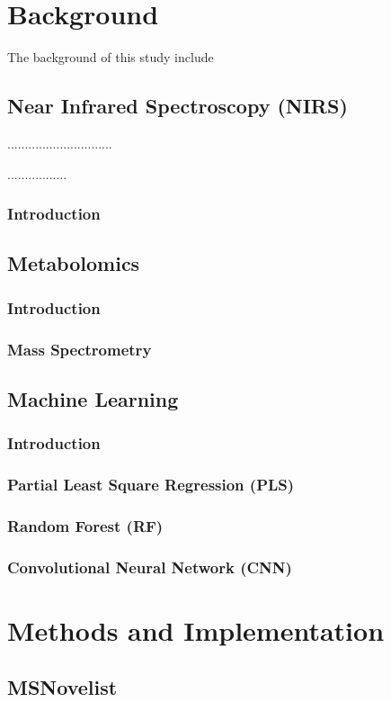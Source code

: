 \documentclass[12pt,a4paper]{report}
\begin{document}
\chapter{Background}
The background of this study include
\section{Near Infrared Spectroscopy (NIRS)}
..............................\par
.................
\subsection{Introduction}
\section{Metabolomics}
\subsection{Introduction}
\subsection{Mass Spectrometry}


\section{Machine Learning}
\subsection{Introduction}
\subsection{Partial Least Square Regression (PLS)}
\subsection{Random Forest (RF)}
\subsection{Convolutional Neural Network (CNN)}



\chapter{Methods and Implementation}
\section{MSNovelist}
\end{document}
